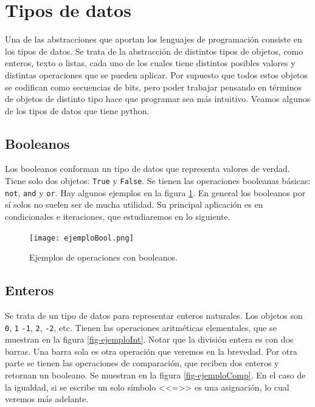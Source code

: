 \documentclass[a4paper, 12pt]{report}
\theoremstyle{definition}
\begin{document}
\section{Tipos de datos}

Una de las abstracciones que aportan los lenguajes de programación consiste en los tipos de datos. Se trata de la abstracción de distintos tipos de objetos, como enteros, texto o listas, cada uno de los cuales tiene distintos posibles valores y distintas operaciones que se pueden aplicar. Por supuesto que todos estos objetos se codifican como secuencias de bits, pero poder trabajar pensando en términos de objetos de distinto tipo hace que programar sea más intuitivo. Veamos algunos de los tipos de datos que tiene python.

\subsection{Booleanos}

Los booleanos conforman un tipo de datos que representa valores de verdad. Tiene solo dos objetos: {\tt True} y {\tt False}. Se tienen las operaciones booleanas básicas: {\tt not}, {\tt and} y {\tt or}. Hay algunos ejemplos en la figura \ref{fig-ejemploBool}. En general los booleanos por sí solos no suelen ser de mucha utilidad. Su principal aplicación es en condicionales e iteraciones, que estudiaremos en lo siguiente.

\begin{figure}
	\centering
	\texttt{[image: ejemploBool.png]}
	\caption{Ejemplos de operaciones con booleanos.}
	\label{fig-ejemploBool}
\end{figure}

\subsection{Enteros}

Se trata de un tipo de datos para representar enteros naturales. Los objetos son {\tt 0}, {\tt 1} {\tt -1}, {\tt 2}, {\tt -2}, etc. Tienen las operaciones aritméticas elementales, que se muestran en la figura \ref{fig-ejemploInt}. Notar que la división entera es con dos barras. Una barra sola es otra operación que veremos en la brevedad. Por otra parte se tienen las operaciones de comparación, que reciben dos enteros y retornan un booleano. Se muestran en la figura \ref{fig-ejemploComp}. En el caso de la igualdad, si se escribe un solo símbolo <<=>> es una asignación, lo cual veremos más adelante.
\end{document}
